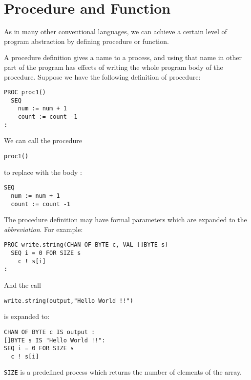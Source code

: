 \section{Procedure and Function}

As in many other conventional languages, we can achieve a certain
level of program abstraction by defining procedure or function.


A procedure definition gives a name to a process, and using that name
in other part of the program has effects of writing the whole
program body of the procedure.
Suppose we have the following definition of
procedure: 
\begin{lin}
\begin{verbatim}
PROC proc1()
  SEQ
    num := num + 1
    count := count -1
:
\end{verbatim}
\end{lin}
We can call the procedure 
\begin{lin}
\begin{verbatim}
proc1()
\end{verbatim}
\end{lin}
to replace with the body :
\begin{lin}
\begin{verbatim}
SEQ
  num := num + 1
  count := count -1
\end{verbatim}
\end{lin}

The procedure definition may have formal parameters which are
expanded to the {\em abbreviation}.
For example:
\begin{lin}
\begin{verbatim}
PROC write.string(CHAN OF BYTE c, VAL []BYTE s)
  SEQ i = 0 FOR SIZE s
    c ! s[i]
:
\end{verbatim}
\end{lin}
And the call
\begin{lin}
\begin{verbatim}
write.string(output,"Hello World !!")
\end{verbatim}
\end{lin}
is expanded to:
\begin{lin}
\begin{verbatim}
CHAN OF BYTE c IS output :
[]BYTE s IS "Hello World !!":
SEQ i = 0 FOR SIZE s
  c ! s[i]
\end{verbatim}
\end{lin}
{\tt SIZE} is a predefined process which returns the number of
elements of the array.

